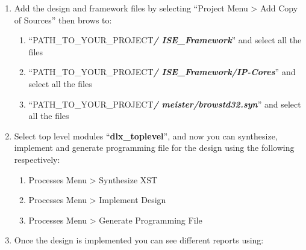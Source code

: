 \documentclass[
]{article}
\begin{document}
\begin{enumerate}
\def\labelenumi{\arabic{enumi}.}
\setcounter{enumi}{4}
\item
  Add the design and framework files by selecting ``Project Menu
  \textgreater{} Add Copy of Sources'' then brows to:

  \begin{enumerate}
  \def\labelenumii{\arabic{enumii}.}
  \item
    ``PATH\_TO\_YOUR\_PROJECT\emph{\textbf{/ ISE\_Framework}}'' and
    select all the files
  \item
    ``PATH\_TO\_YOUR\_PROJECT\emph{\textbf{/ ISE\_Framework/IP-Cores}}''
    and select all the files
  \item
    ``PATH\_TO\_YOUR\_PROJECT\emph{\textbf{/
    meister/}}\emph{\textbf{browstd32.syn}}'' and select all the files
  \end{enumerate}
\item
  Select top level modules ``\textbf{dlx\_toplevel}'', and now you can
  synthesize, implement and generate programming file for the design
  using the following respectively:

  \begin{enumerate}
  \def\labelenumii{\arabic{enumii}.}
  \item
    Processes Menu \textgreater{} Synthesize XST
  \item
    Processes Menu \textgreater{} Implement Design
  \item
    Processes Menu \textgreater{} Generate Programming File
  \end{enumerate}
\item
  Once the design is implemented you can see different reports using:


\end{enumerate}
\end{document}
